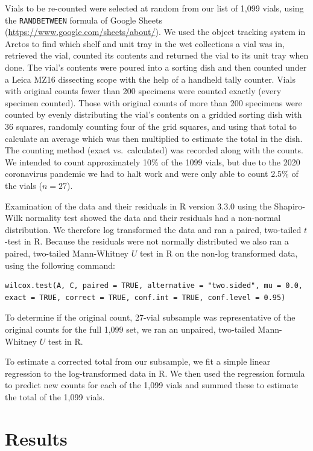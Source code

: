 \begin{multicols}{2}
Vials to be re-counted were selected at random from our list of 1,099 vials, using the \texttt{RANDBETWEEN} formula of Google Sheets (\url{https://www.google.com/sheets/about/}). We used the object tracking system in Arctos to find which shelf and unit tray in the  wet collections a vial was in, retrieved the vial, counted its contents and returned the vial to its unit tray when done. The vial’s contents were poured into a sorting dish and then counted under a Leica MZ16 dissecting scope with the help of a handheld tally counter. Vials with original counts fewer than 200 specimens were counted exactly (every specimen counted). Those with original counts of more than 200 specimens were counted by evenly distributing the vial's contents on a gridded sorting dish with 36 squares, randomly counting four of the grid squares, and using that total to calculate an average which was then multiplied to estimate the total in the dish. The counting method (exact vs.\ calculated) was recorded along with the counts. We intended to count approximately 10\% of the 1099 vials, but due to the 2020 coronavirus pandemic we had to halt work and were only able to count 2.5\% of the vials ($n=27$).
  
Examination of the data and their residuals in R version 3.3.0 \citep{RCoreTeam2016} using the Shapiro-Wilk normality test showed the data and their residuals had a non-normal distribution. We therefore log transformed the data and ran a paired, two-tailed $t$-test in R. Because the residuals were not normally distributed we also ran a paired, two-tailed Mann-Whitney $U$ test in R on the non-log transformed data, using the following command: 

\begin{Verbatim}[breaklines=true]
wilcox.test(A, C, paired = TRUE, alternative = "two.sided", mu = 0.0, exact = TRUE, correct = TRUE, conf.int = TRUE, conf.level = 0.95)
\end{Verbatim}

To determine if the original count, 27-vial subsample was representative of the original counts for the full 1,099 set, we ran an unpaired, two-tailed Mann-Whitney $U$ test in R. 

To estimate a corrected total from our subsample, we fit a simple linear regression to the log-transformed data in R. We then used the regression formula to predict new counts for each of the 1,099 vials and summed these to estimate the total of the 1,099 vials.

\section{Results} 


\end{multicols}
